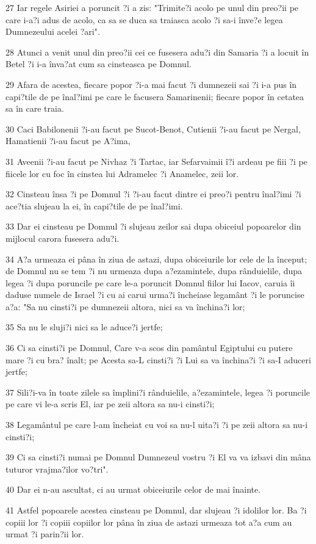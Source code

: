 \par 27 Iar regele Asiriei a poruncit ?i a zis: "Trimite?i acolo pe unul din preo?ii pe care i-a?i adus de acolo, ca sa se duca sa traiasca acolo ?i sa-i înve?e legea Dumnezeului acelei ?ari".
\par 28 Atunci a venit unul din preo?ii cei ce fusesera adu?i din Samaria ?i a locuit în Betel ?i i-a înva?at cum sa cinsteasca pe Domnul.
\par 29 Afara de acestea, fiecare popor ?i-a mai facut ?i dumnezeii sai ?i i-a pus în capi?tile de pe înal?imi pe care le facusera Samarinenii; fiecare popor în cetatea sa în care traia.
\par 30 Caci Babilonenii ?i-au facut pe Sucot-Benot, Cutienii ?i-au facut pe Nergal, Hamatienii ?i-au facut pe A?ima,
\par 31 Aveenii ?i-au facut pe Nivhaz ?i Tartac, iar Sefarvaimii î?i ardeau pe fiii ?i pe fiicele lor cu foc în cinstea lui Adramelec ?i Anamelec, zeii lor.
\par 32 Cinsteau însa ?i pe Domnul ?i ?i-au facut dintre ei preo?i pentru înal?imi ?i ace?tia slujeau la ei, în capi?tile de pe înal?imi.
\par 33 Dar ei cinsteau pe Domnul ?i slujeau zeilor sai dupa obiceiul popoarelor din mijlocul carora fusesera adu?i.
\par 34 A?a urmeaza ei pâna în ziua de astazi, dupa obiceiurile lor cele de la început; de Domnul nu se tem ?i nu urmeaza dupa a?ezamintele, dupa rânduielile, dupa legea ?i dupa poruncile pe care le-a poruncit Domnul fiilor lui Iacov, caruia îi daduse numele de Israel ?i cu ai carui urma?i încheiase legamânt ?i le poruncise a?a: "Sa nu cinsti?i pe dumnezeii altora, nici sa va închina?i lor;
\par 35 Sa nu le sluji?i nici sa le aduce?i jertfe;
\par 36 Ci sa cinsti?i pe Domnul, Care v-a scos din pamântul Egiptului cu putere mare ?i cu bra? înalt; pe Acesta sa-L cinsti?i ?i Lui sa va închina?i ?i sa-I aduceri jertfe;
\par 37 Sili?i-va în toate zilele sa împlini?i rânduielile, a?ezamintele, legea ?i poruncile pe care vi le-a scris El, iar pe zeii altora sa nu-i cinsti?i;
\par 38 Legamântul pe care l-am încheiat cu voi sa nu-l uita?i ?i pe zeii altora sa nu-i cinsti?i;
\par 39 Ci sa cinsti?i numai pe Domnul Dumnezeul vostru ?i El va va izbavi din mâna tuturor vrajma?ilor vo?tri".
\par 40 Dar ei n-au ascultat, ci au urmat obiceiurile celor de mai înainte.
\par 41 Astfel popoarele acestea cinsteau pe Domnul, dar slujeau ?i idolilor lor. Ba ?i copiii lor ?i copiii copiilor lor pâna în ziua de astazi urmeaza tot a?a cum au urmat ?i parin?ii lor.

